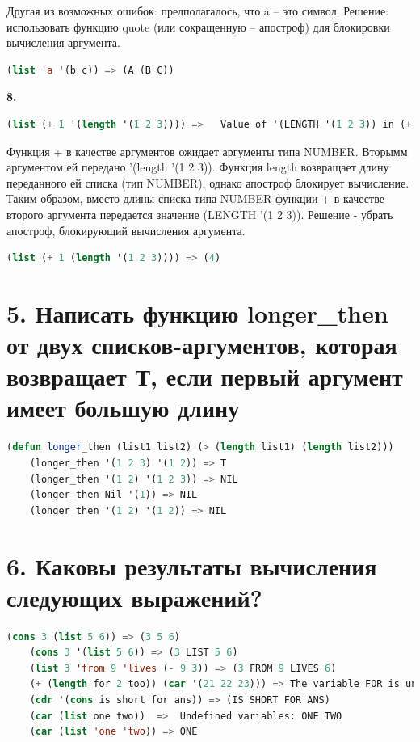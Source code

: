 \documentclass[12pt]{report}
\begin{document}
Другая из возможных ошибок: предполагалось, что a -- это символ. Решение: использовать функцию quote (или сокращенную -- апостроф) для блокировки вычисления аргумента.
\begin{lstlisting}[language=Lisp]
	(list 'a '(b c)) => (A (B C))
\end{lstlisting}







\clearpage
\textbf{8.} 

\begin{lstlisting}[language=Lisp]
	(list (+ 1 '(length '(1 2 3)))) =>   Value of '(LENGTH '(1 2 3)) in (+ 1 '(LENGTH '(1 2 3))) is (LENGTH '(1 2 3)), not a NUMBER.
\end{lstlisting}

Функция + в качестве аргументов ожидает аргументы типа NUMBER. Вторымм аргументом ей передано '(length '(1 2 3)). Функция length возвращает длину переданного ей списка (тип NUMBER), однако апостроф блокирует вычисление. Таким образом, вместо длины списка типа NUMBER функции + в качестве второго аргумента передается значение (LENGTH '(1 2 3)). Решение - убрать апостроф, блокирующий вычисления аргумента.

\begin{lstlisting}[language=Lisp]
	(list (+ 1 (length '(1 2 3)))) => (4)
\end{lstlisting}






\section*{5. Написать функцию longer\_then от двух списков-аргументов, которая возвращает Т, если первый аргумент имеет большую длину}

\begin{lstlisting}[language=Lisp]
	(defun longer_then (list1 list2) (> (length list1) (length list2)))
	(longer_then '(1 2 3) '(1 2)) => T
	(longer_then '(1 2) '(1 2 3)) => NIL
	(longer_then Nil '(1)) => NIL
	(longer_then '(1 2) '(1 2)) => NIL
\end{lstlisting}

\section*{6. Каковы результаты вычисления следующих выражений?}

\begin{lstlisting}[language=Lisp]
	(cons 3 (list 5 6)) => (3 5 6)
	(cons 3 '(list 5 6)) => (3 LIST 5 6)
	(list 3 'from 9 'lives (- 9 3)) => (3 FROM 9 LIVES 6)
	(+ (length for 2 too)) (car '(21 22 23))) => The variable FOR is unbound.
	(cdr '(cons is short for ans)) => (IS SHORT FOR ANS)
	(car (list one two))  =>  Undefined variables: ONE TWO
	(car (list 'one 'two)) => ONE
\end{lstlisting}
\end{document}
